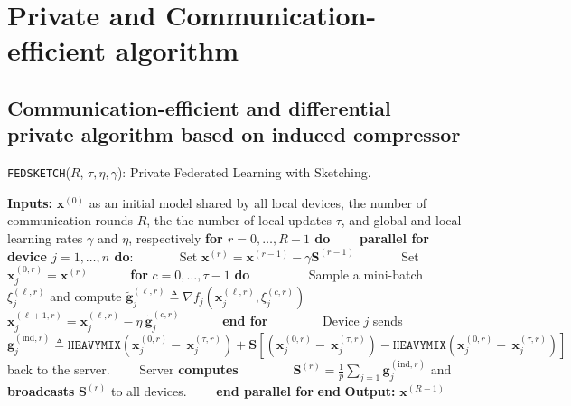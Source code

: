 \section{Private and Communication-efficient algorithm}


\subsection{Communication-efficient and differential private algorithm based on induced compressor}

\begin{algorithm}[H]
\caption{\texttt{FEDSKETCH}($R$, $\tau, \eta, \gamma$): Private Federated Learning with Sketching. }\label{Alg:combined}
\begin{algorithmic}[1]
\State \textbf{Inputs:} $\boldsymbol{x}^{(0)}$ as an initial  model shared by all local devices, the number of communication rounds $R$, the the number of local updates $\tau$, and global and local learning rates $\gamma$ and $\eta$, respectively
\State \textbf{for $r=0, \ldots, R-1$ do}
\State $\qquad$\textbf{parallel for device $j=1,\ldots,n$ do}:
\State $\qquad\quad$ Set $\boldsymbol{x}^{(r)}=\boldsymbol{x}^{(r-1)}-\gamma{\mathbf{S}}^{(r-1)}$
\State $\qquad\quad$ Set $\boldsymbol{x}_j^{(0,r)}=\boldsymbol{x}^{(r)}$ 
\State $\qquad\quad $\textbf{for} $c=0,\ldots,\tau-1$ \textbf{do}
\State $\qquad\quad\quad$ Sample a mini-batch $\xi_j^{(\ell,r)}$ and compute $\tilde{\mathbf{g}}_{j}^{(\ell,r)}\triangleq\nabla{f}_j(\boldsymbol{x}^{(\ell,r)}_j,\xi_j^{(c,r)})$
\State $\qquad\quad\quad$ $\boldsymbol{x}^{(\ell+1,r)}_{j}=\boldsymbol{x}^{(\ell,r)}_j-\eta~ \tilde{\mathbf{g}}_{j}^{(c,r)}$ \label{eq:update-rule-alg}
\State $\qquad\quad$\textbf{end for}
\State $\qquad\quad\quad$Device $j$ sends $$\mathbf{g}^{(\text{ind},r)}_j\triangleq \texttt{HEAVYMIX}\left(\boldsymbol{x}_j^{(0,r)}-~{\boldsymbol{x}}_{j}^{(\tau,r)}\right)+\mathbf{S}\left[\left(\boldsymbol{x}_j^{(0,r)}-~{\boldsymbol{x}}_{j}^{(\tau,r)}\right)-\texttt{HEAVYMIX}\left(\boldsymbol{x}_j^{(0,r)}-~{\boldsymbol{x}}_{j}^{(\tau,r)}\right)\right]$$ 
back to the server.
\State $\qquad$Server \textbf{computes} 
\State $\qquad\qquad {\mathbf{S}}^{(r)}=\frac{1}{p}\sum_{j=1}\mathbf{g}^{(\text{ind},r)}_j$ and \textbf{broadcasts} ${\mathbf{S}}^{(r)}$ to all devices.
\State $\qquad$\textbf{end parallel for}
\State \textbf{end}
\State \textbf{Output:} ${\boldsymbol{x}}^{(R-1)}$
\vspace{- 0.1cm}
\end{algorithmic}
\end{algorithm}

